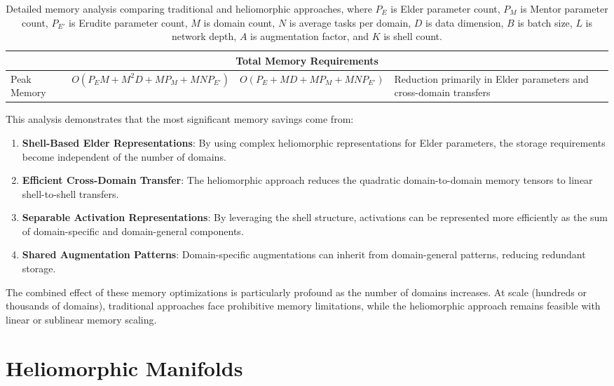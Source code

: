 \begin{table}[h]
\begin{tabular}{|p{3.5cm}|p{3.5cm}|p{3.5cm}|p{3.5cm}|}
\hline
\multicolumn{4}{|c|}{\textbf{Total Memory Requirements}} \\
\hline
Peak Memory & $O(P_E M + M^2 D + MP_M + MNP_{E'})$ & $O(P_E + MD + MP_M + MNP_{E'})$ & Reduction primarily in Elder parameters and cross-domain transfers \\
\hline
\end{tabular}
\caption{Detailed memory analysis comparing traditional and heliomorphic approaches, where $P_E$ is Elder parameter count, $P_M$ is Mentor parameter count, $P_{E'}$ is Erudite parameter count, $M$ is domain count, $N$ is average tasks per domain, $D$ is data dimension, $B$ is batch size, $L$ is network depth, $A$ is augmentation factor, and $K$ is shell count.}
\label{tab:memory_analysis}
\end{table}

This analysis demonstrates that the most significant memory savings come from:

\begin{enumerate}
    \item \textbf{Shell-Based Elder Representations}: By using complex heliomorphic representations for Elder parameters, the storage requirements become independent of the number of domains.
    
    \item \textbf{Efficient Cross-Domain Transfer}: The heliomorphic approach reduces the quadratic domain-to-domain memory tensors to linear shell-to-shell transfers.
    
    \item \textbf{Separable Activation Representations}: By leveraging the shell structure, activations can be represented more efficiently as the sum of domain-specific and domain-general components.
    
    \item \textbf{Shared Augmentation Patterns}: Domain-specific augmentations can inherit from domain-general patterns, reducing redundant storage.
\end{enumerate}

The combined effect of these memory optimizations is particularly profound as the number of domains increases. At scale (hundreds or thousands of domains), traditional approaches face prohibitive memory limitations, while the heliomorphic approach remains feasible with linear or sublinear memory scaling.

\section{Heliomorphic Manifolds}

